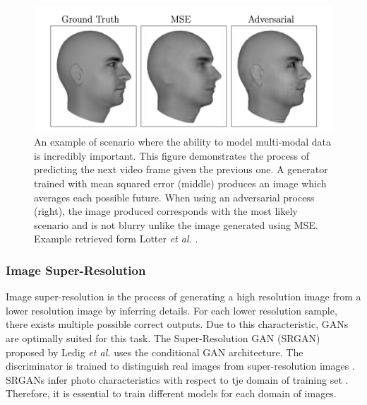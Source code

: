 \documentclass[11pt]{article}
\begin{document}
\begin{figure}
\centering
\includegraphics[scale=0.9]{multimodal}
\caption{An example of scenario where the ability to model multi-modal data is incredibly important. This figure demonstrates the process of predicting the next video frame given the previous one. A generator trained with mean squared error (middle) produces an image which averages each possible future. When using an adversarial process (right), the image produced corresponds with the most likely scenario and is not blurry unlike the image generated using MSE. Example retrieved form Lotter \textit{et al.} \citep{2015arXiv151106380L}.}
\label{fig:multimodal}
\end{figure}

\subsubsection{Image Super-Resolution}
Image super-resolution is the process of generating a high resolution image from a lower resolution image by inferring details. For each lower resolution sample, there exists multiple possible correct outputs. Due to this characteristic, GANs are optimally suited for this task. The Super-Resolution GAN (SRGAN) proposed by Ledig \textit{et al.} uses the conditional GAN architecture. The discriminator is trained to distinguish real images from super-resolution images \citep{2016arXiv160904802L}. SRGANs infer photo characteristics with respect to tje domain of training set \citep{2017arXiv171007035C}. Therefore, it is essential to train different models for each domain of images.
\end{document}
